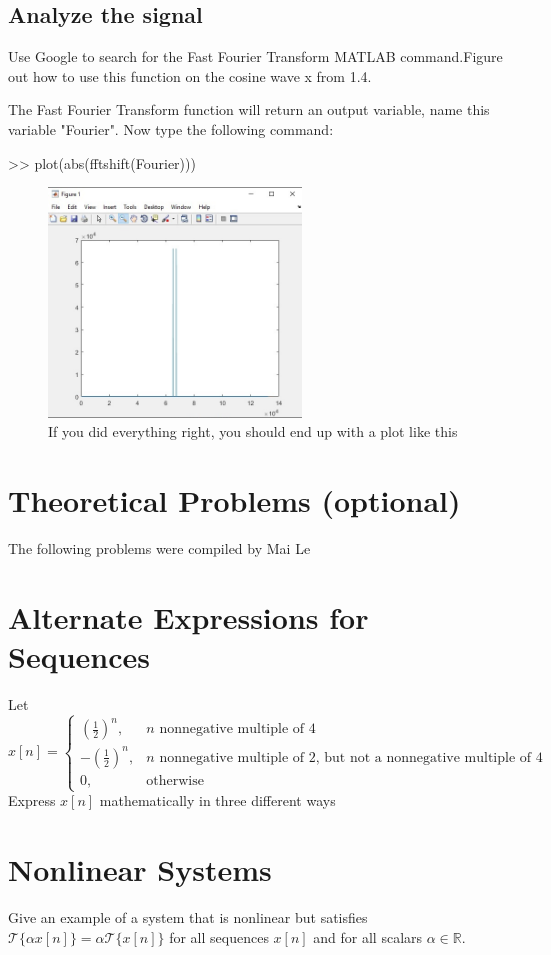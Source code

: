 \documentclass[11pt]{article}
\begin{document}
\subsection{Analyze the signal}
Use Google to search for the Fast Fourier Transform MATLAB command.\newline Figure out how to use this function on the cosine wave x from 1.4.\newline

\vspace{3mm}

The Fast Fourier Transform function will return an output variable, name this variable "Fourier".\newline
Now type the following command:

\begin{center}

>> plot(abs(fftshift(Fourier)))

\end{center}

\vspace{80mm}
\begin{figure}[h]

\centering
\includegraphics[width=0.6\textwidth]{cosineFFTplot}
\caption {If you did everything right, you should end up with a plot like this}
\end{figure}

\section*{Theoretical Problems (optional)}
The following problems were compiled by Mai Le

\section{Alternate Expressions for Sequences}
Let $x[n] = \begin{cases} \left(\frac{1}{2}\right)^n, & n \text{ nonnegative multiple of 4} \\ -\left(\frac{1}{2}\right)^n, & n \text{ nonnegative multiple of 2, but not a nonnegative multiple of 4} \\ 0, & \text{otherwise}\end{cases}$ \\
Express $x[n]$ mathematically in three different ways

\section{Nonlinear Systems}
Give an example of a system that is nonlinear but satisfies $\mathcal{T}\{\alpha x[n]\} = \alpha \mathcal{T}\{x[n]\}$ for all sequences $x[n]$ and for all scalars $\alpha \in \mathbb{R}$.
\end{document}
